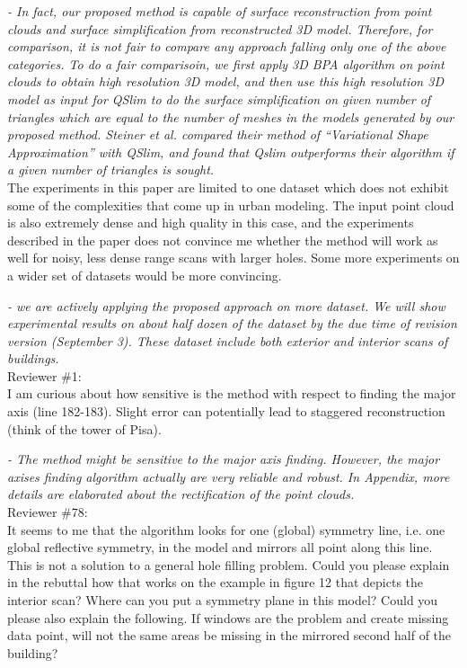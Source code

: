 \documentclass[12pt,letterpaper]{article}
\begin{document}
{\it- In fact, our proposed method is capable of surface reconstruction from point clouds
and surface simplification from reconstructed 3D model. Therefore, for comparison, it is
not fair to compare any approach falling only one of the above categories. To do a fair
comparisoin, we first apply 3D BPA algorithm on point clouds to obtain high resolution 3D model, 
and then use this high resolution 3D model as input for QSlim to do the surface simplification
on given number of triangles which are equal to the number of meshes in the models generated by
our proposed method.
Steiner et al. compared their method of ``Variational Shape Approximation'' 
with QSlim, and found that Qslim outperforms their algorithm if a given number of triangles is sought.} \\

The experiments in this paper are limited to one dataset which does not exhibit some
of the complexities that come up in urban modeling. The input point cloud is also
extremely dense and high quality in this case, and the experiments described in the
paper does not convince me whether the method will work as well for noisy, less dense
range scans with larger holes. Some more experiments on a wider set of datasets would
be more convincing.

{\it- we are actively applying the proposed approach on more dataset. 
We will show experimental results on about half dozen of the dataset by the due time of revision version (September 3). 
These dataset include both exterior and interior scans of buildings.}\\


Reviewer \#1:\\

I am curious about how sensitive is the method with respect to finding the major axis
(line 182-183). Slight error can potentially lead to staggered reconstruction (think
of the tower of Pisa).

{\it- The method might be sensitive to the major axis finding. However, the major axises
finding algorithm actually are very reliable and robust. In Appendix, more details are elaborated about
the rectification of the point clouds.} \\

Reviewer \#78:\\

It seems to me that the algorithm looks for one (global) symmetry line,
i.e. one global reflective symmetry, in the model and mirrors all
point along this line. This is not a solution to a general
hole filling problem.
Could you please explain in the rebuttal how that works on
the example in figure 12 that depicts the interior scan?
Where can you put a symmetry plane in this model?
Could you please also explain the following. If windows are the problem
and create missing data point, will not the same areas be missing
in the mirrored second half of the building?
\end{document}
